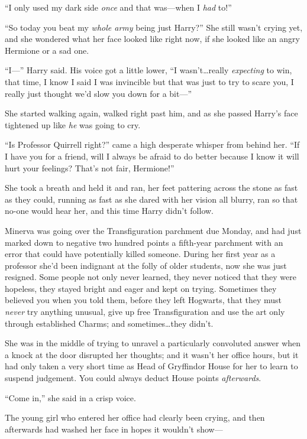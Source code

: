 “I only used my dark side \emph{once} and that was—when I \emph{had} to!”

“So today you beat my \emph{whole army} being just Harry?” She still wasn’t crying yet, and she wondered what her face looked like right now, if she looked like an angry Hermione or a sad one.

“I—” Harry said. His voice got a little lower, “I wasn’t…really \emph{expecting} to win, that time, I know I said I was invincible but that was just to try to scare you, I really just thought we’d slow you down for a bit—”

She started walking again, walked right past him, and as she passed Harry’s face tightened up like \emph{he} was going to cry.

“Is Professor Quirrell right?” came a high desperate whisper from behind her. “If I have you for a friend, will I always be afraid to do better because I know it will hurt your feelings? That’s not fair, Hermione!”

She took a breath and held it and ran, her feet pattering across the stone as fast as they could, running as fast as she dared with her vision all blurry, ran so that no-one would hear her, and this time Harry didn’t follow.

\later

Minerva was going over the Transfiguration parchment due Monday, and had just marked down to negative two hundred points a fifth-year parchment with an error that could have potentially killed someone. During her first year as a professor she’d been indignant at the folly of older students, now she was just resigned. Some people not only never learned, they never noticed that they were hopeless, they stayed bright and eager and kept on trying. Sometimes they believed you when you told them, before they left Hogwarts, that they must \emph{never} try anything unusual, give up free Transfiguration and use the art only through established Charms; and sometimes…they didn’t.

She was in the middle of trying to unravel a particularly convoluted answer when a knock at the door disrupted her thoughts; and it wasn’t her office hours, but it had only taken a very short time as Head of Gryffindor House for her to learn to suspend judgement. You could always deduct House points \emph{afterwards}.

“Come in,” she said in a crisp voice.

The young girl who entered her office had clearly been crying, and then afterwards had washed her face in hopes it wouldn’t show—

